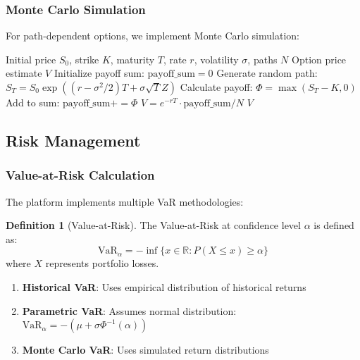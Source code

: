 \documentclass[12pt,a4paper]{article}
\theoremstyle{definition}
\newtheorem{definition}[theorem]{Definition}
\theoremstyle{remark}
\begin{document}
\subsubsection{Monte Carlo Simulation}

For path-dependent options, we implement Monte Carlo simulation:

\begin{algorithm}
\caption{Monte Carlo Option Pricing}
\begin{algorithmic}[1]
\REQUIRE Initial price $S_0$, strike $K$, maturity $T$, rate $r$, volatility $\sigma$, paths $N$
\ENSURE Option price estimate $V$
\STATE Initialize payoff sum: $\text{payoff\_sum} = 0$
    \STATE Generate random path: $S_T = S_0 \exp\left((r - \sigma^2/2)T + \sigma\sqrt{T}Z\right)$
    \STATE Calculate payoff: $\Phi = \max(S_T - K, 0)$
    \STATE Add to sum: $\text{payoff\_sum} += \Phi$
\ENDFOR
\STATE $V = e^{-rT} \cdot \text{payoff\_sum} / N$
\RETURN $V$
\end{algorithmic}
\end{algorithm}

\subsection{Risk Management}

\subsubsection{Value-at-Risk Calculation}

The platform implements multiple VaR methodologies:

\begin{definition}[Value-at-Risk]
The Value-at-Risk at confidence level $\alpha$ is defined as:
\begin{equation}
\text{VaR}_\alpha = -\inf\{x \in \mathbb{R} : P(X \leq x) \geq \alpha\}
\end{equation}
where $X$ represents portfolio losses.
\end{definition}

\begin{enumerate}
    \item \textbf{Historical VaR}: Uses empirical distribution of historical returns
    \item \textbf{Parametric VaR}: Assumes normal distribution: $\text{VaR}_\alpha = -(\mu + \sigma \Phi^{-1}(\alpha))$
    \item \textbf{Monte Carlo VaR}: Uses simulated return distributions
\end{enumerate}
\end{document}
